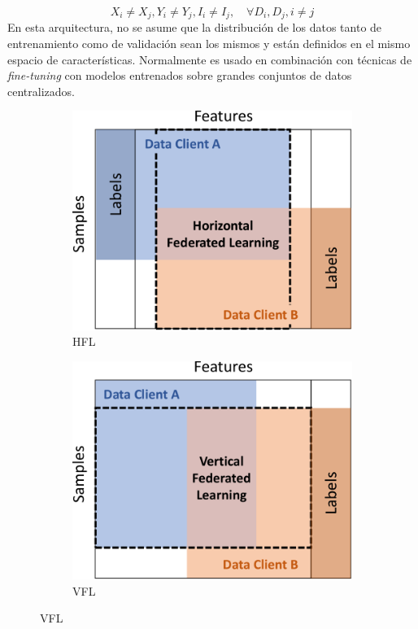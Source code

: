 \begin{itemize}
    \begin{equation}
        X_i \ne X_j, Y_i \ne Y_j, I_i \ne I_j, \quad \forall D_i, D_j, i \ne j
    \end{equation}
    En esta arquitectura, no se asume que la distribución de los datos tanto de entrenamiento como de validación sean los mismos y están definidos en el mismo espacio de características. Normalmente es usado en combinación con técnicas de \textit{fine-tuning} con modelos entrenados sobre grandes conjuntos de datos centralizados.
    \begin{figure}[h!]
        \centering
        \begin{subfigure}[]{0.3\textwidth}
            \includegraphics[width=0.95\linewidth]{figuras/hfl.pdf}
            \caption{\ac{HFL} }
            \label{fig:first}
        \end{subfigure}
        
        \hfill
        \vspace{3mm}
        
        \begin{subfigure}[]{0.3\textwidth}
            \includegraphics[width=0.95\linewidth]{figuras/vfl.pdf}
            \caption{\ac{VFL} }
            \label{fig:second}
        \end{subfigure}
        

\end{figure}
\end{itemize}
